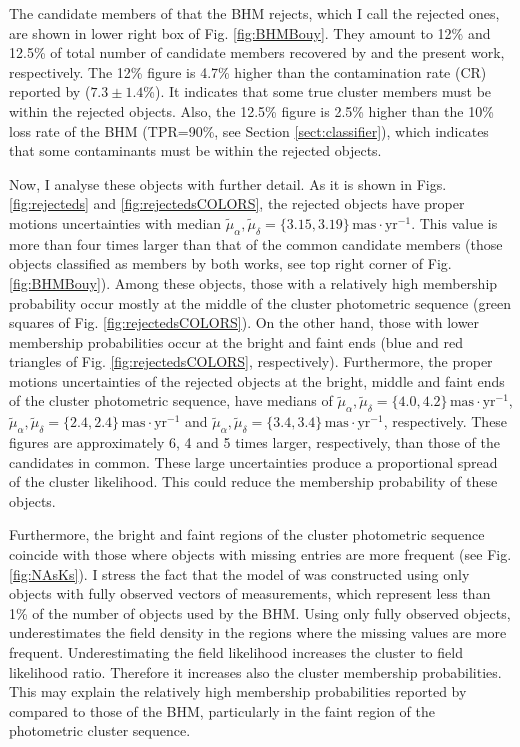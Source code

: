 The candidate members of \citet{Bouy2015} that the BHM rejects, which I call the rejected ones, are shown in lower right box of Fig. \ref{fig:BHMBouy}. They amount to 12\% and 12.5\% of total number of candidate members recovered by \citet{Bouy2015} and the present work, respectively. The 12\% figure is 4.7\% higher than the contamination rate (CR) reported by \citet{Sarro2014} ($7.3\pm1.4$\%). It indicates that some true cluster members must be within the rejected objects. Also, the 12.5\% figure is 2.5\% higher than the 10\% loss rate of the BHM (TPR=90\%, see Section \ref{sect:classifier}), which indicates that some contaminants must be within the rejected objects.

Now, I analyse these objects with further detail. As it is shown in Figs. \ref{fig:rejecteds} and \ref{fig:rejectedsCOLORS}, the rejected objects have proper motions uncertainties with median $\tilde{\mu}_{\alpha},\tilde{\mu}_{\delta}=\{3.15,3.19\} \,\mathrm{mas\cdot yr^{-1}}$. This value is more than four times larger than that of the common candidate members (those objects classified as members by both works, see top right corner of Fig. \ref{fig:BHMBouy}). Among these objects, those with a relatively high membership probability occur mostly at the middle of the cluster photometric sequence (green squares of Fig. \ref{fig:rejectedsCOLORS}). On the other hand, those with lower membership probabilities occur at the bright and faint ends (blue and red triangles of Fig. \ref{fig:rejectedsCOLORS}, respectively). Furthermore, the proper motions uncertainties of the rejected objects at the bright, middle and faint ends of the cluster photometric sequence, have medians of $\tilde{\mu}_{\alpha},\tilde{\mu}_{\delta}=\{4.0,4.2\}  \,\mathrm{mas\cdot yr^{-1}}$, $\tilde{\mu}_{\alpha},\tilde{\mu}_{\delta}=\{2.4,2.4\}\,\mathrm{mas\cdot yr^{-1}}$ and $\tilde{\mu}_{\alpha},\tilde{\mu}_{\delta}=\{3.4,3.4\}\,\mathrm{mas\cdot yr^{-1}}$, respectively. These figures are approximately 6, 4 and 5 times larger, respectively, than those of the candidates in common. These large uncertainties produce a proportional spread of the cluster likelihood. This could reduce the membership probability of these objects.

Furthermore, the bright and faint regions of the cluster photometric sequence coincide with those where objects with missing entries are more frequent (see Fig. \ref{fig:NAsKs}). I stress the fact that the model of \citet{Bouy2015} was constructed using only objects with fully observed vectors of measurements, which represent less than 1\% of the number of objects used by the BHM. Using only fully observed objects, underestimates the field density in the regions where the missing values are more frequent. Underestimating the field likelihood increases the cluster to field likelihood ratio. Therefore it increases also the cluster membership probabilities. This may explain the relatively high membership probabilities reported by \citet{Bouy2015} compared to those of the BHM, particularly in the faint region of the photometric cluster sequence. 

